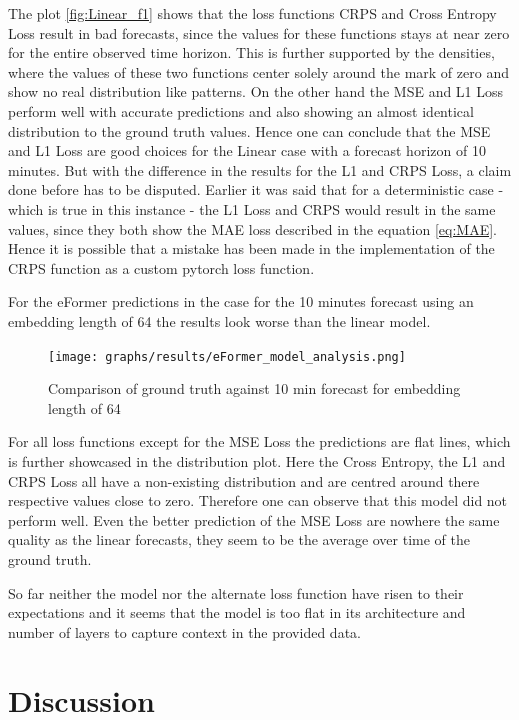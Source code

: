\documentclass{article}
\begin{document}
The plot \ref{fig:Linear_f1} shows that the loss functions CRPS and Cross Entropy Loss result in bad forecasts, since the values for these functions stays at near zero for the entire observed time horizon. This is further supported by the densities, where the values of these two functions center solely around the mark of zero and show no real distribution like patterns. On the other hand the MSE and L1 Loss perform well with accurate predictions and also showing an almost identical distribution to the ground truth values. Hence one can conclude that the MSE and L1 Loss are good choices for the Linear case with a forecast horizon of 10 minutes. But with the difference in the results for the L1 and CRPS Loss, a claim done before has to be disputed. Earlier it was said that for a deterministic case - which is true in this instance - the L1 Loss and CRPS would result in the same values, since they both show the MAE loss described in the equation \ref{eq:MAE}. Hence it is possible that a mistake has been made in the implementation of the CRPS function as a custom pytorch loss function. \par 
For the eFormer predictions in the case for the 10 minutes forecast using an embedding length of 64 the results look worse than the linear model.

\begin{figure}
    \centering
    \texttt{[image: graphs/results/eFormer\_model\_analysis.png]}
    \caption{Comparison of ground truth against 10 min forecast for embedding length of 64}
    \label{fig:eFormer_f1_emb64}
\end{figure}

For all loss functions except for the MSE Loss the predictions are flat lines, which is further showcased in the distribution plot. Here the Cross Entropy, the L1 and CRPS Loss all have a non-existing distribution and are centred around there respective values close to zero. Therefore one can observe that this model did not perform well. Even the better prediction of the MSE Loss are nowhere the same quality as the linear forecasts, they seem to be the average over time of the ground truth. \par 
So far neither the model nor the alternate loss function have risen to their expectations and it seems that the model is too flat in its architecture and number of layers to capture context in the provided data.

\section{Discussion}
\end{document}
